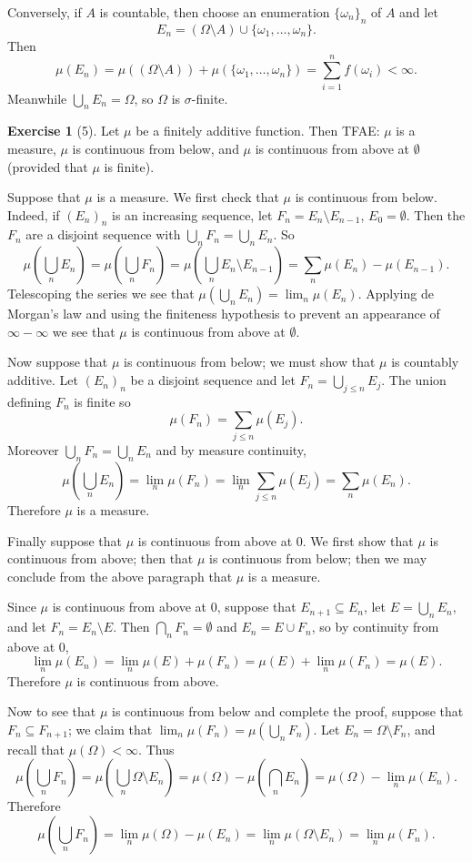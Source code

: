 \documentclass[10pt]{article}
\theoremstyle{definition}
\newtheorem{exer}{Exercise}
\begin{document}
Conversely, if $A$ is countable, then choose an enumeration $\{\omega_n\}_n$ of $A$ and let
$$E_n = (\Omega \setminus A) \cup \{\omega_1, \dots, \omega_n\}.$$
Then
$$\mu(E_n) = \mu((\Omega \setminus A)) + \mu(\{\omega_1, \dots, \omega_n\}) = \sum_{i=1}^n f(\omega_i) < \infty.$$
Meanwhile $\bigcup_n E_n = \Omega$, so $\Omega$ is $\sigma$-finite.

\begin{exer}[5]
Let $\mu$ be a finitely additive function. Then TFAE: $\mu$ is a measure, $\mu$ is continuous from below, and $\mu$ is continuous from above at $\emptyset$ (provided that $\mu$ is finite).
\end{exer}

Suppose that $\mu$ is a measure. We first check that $\mu$ is continuous from below. Indeed, if $(E_n)_n$ is an increasing sequence, let $F_n = E_n \setminus E_{n-1}$, $E_0 = \emptyset$. Then the $F_n$ are a disjoint sequence with $\bigcup_n F_n = \bigcup_n E_n$. So
$$\mu\left(\bigcup_n E_n\right) = \mu\left(\bigcup_n F_n\right) = \mu\left(\bigcup_n E_n \setminus E_{n-1}\right) = \sum_n \mu(E_n) - \mu(E_{n-1}).$$
Telescoping the series we see that $\mu(\bigcup_n E_n) = \lim_n \mu(E_n)$. Applying de Morgan's law and using the finiteness hypothesis to prevent an appearance of $\infty - \infty$ we see that $\mu$ is continuous from above at $\emptyset$.

Now suppose that $\mu$ is continuous from below; we must show that $\mu$ is countably additive.
Let $(E_n)_n$ be a disjoint sequence and let $F_n = \bigcup_{j \leq n} E_j$. The union defining $F_n$ is finite so
$$\mu(F_n) = \sum_{j \leq n} \mu(E_j).$$
Moreover $\bigcup_n F_n = \bigcup_n E_n$ and by measure continuity,
$$\mu\left(\bigcup_n E_n\right) = \lim_n \mu(F_n) = \lim_n \sum_{j \leq n} \mu(E_j) = \sum_n \mu(E_n).$$
Therefore $\mu$ is a measure.

Finally suppose that $\mu$ is continuous from above at $0$. We first show that $\mu$ is continuous from above; then that $\mu$ is continuous from below; then we may conclude from the above paragraph that $\mu$ is a measure.

Since $\mu$ is continuous from above at $0$, suppose that $E_{n+1} \subseteq E_n$, let $E = \bigcup_n E_n$, and let $F_n = E_n \setminus E$. Then $\bigcap_n F_n = \emptyset$ and $E_n = E \cup F_n$, so by continuity from above at $0$,
$$\lim_n \mu(E_n) = \lim_n \mu(E) + \mu(F_n) = \mu(E) + \lim_n \mu(F_n) = \mu(E).$$
Therefore $\mu$ is continuous from above.

Now to see that $\mu$ is continuous from below and complete the proof, suppose that $F_n \subseteq F_{n+1}$; we claim that $\lim_n \mu(F_n) = \mu(\bigcup_n F_n)$.
Let $E_n = \Omega \setminus F_n$, and recall that $\mu(\Omega) < \infty$. Thus
$$\mu\left(\bigcup_n F_n \right) = \mu\left(\bigcup_n \Omega \setminus E_n \right) = \mu(\Omega) - \mu\left(\bigcap_n E_n\right) = \mu(\Omega) - \lim_n \mu(E_n).$$
Therefore
$$\mu\left(\bigcup_n F_n \right) = \lim_n \mu(\Omega) - \mu(E_n) = \lim_n \mu(\Omega \setminus E_n) = \lim_n \mu(F_n).$$
\end{document}
